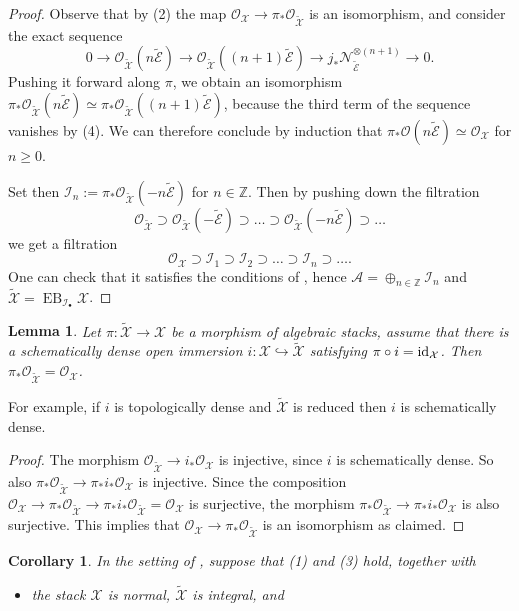 \documentclass{amsart}
\newcommand{\bZ}{\mathbb{Z}}
\newcommand{\cA}{\mathcal{A}}
\newcommand{\cE}{\mathcal{E}}
\newcommand{\cI}{\mathcal{I}}
\newcommand{\cN}{\mathcal{N}}
\newcommand{\cO}{\mathcal{O}}
\newcommand{\cX}{\mathcal{X}}
\newcommand{\id}{\rm{id}}
\DeclareMathOperator{\EB}{EB}
\newtheorem{Lemma}[theorem]{Lemma}
\newtheorem{Cor}[theorem]{Corollary}
\theoremstyle{definition}
\theoremstyle{definition}
\begin{document}
{\begin{proof}
    Observe that by (2) the map $\cO_\cX \to \pi_*\cO_{\widetilde{\cX}}$ is an isomorphism, and consider the exact sequence
    \[ 0 \to \cO_{\widetilde{\cX}}(n\widetilde{\cE}) \to \cO_{\widetilde{\cX}}((n+1)\widetilde{\cE}) \to j_* \cN_{\widetilde{\cE}}^{\otimes (n+1)} \to 0. \]
    Pushing it forward along $\pi$, we obtain an isomorphism $\pi_*\cO_{\widetilde{\cX}}(n\widetilde{\cE})\simeq \pi_*\cO_{\widetilde{\cX}}((n+1)\widetilde{\cE})$, because the third term of the sequence vanishes by (4). We can therefore conclude by induction that $\pi_*\cO(n\widetilde{\cE})\simeq\cO_{\cX}$ for $n\geq 0$.

    Set then $\cI_n:=\pi_*\cO_{\widetilde{\cX}}(-n\widetilde{\cE})$ for $n\in\bZ$. Then by pushing down the filtration
    \[ \cO_{\widetilde{\cX}}\supset \cO_{\widetilde{\cX}}(-\widetilde{\cE}) \supset \ldots \supset \cO_{\widetilde{\cX}}(-n\widetilde{\cE}) \supset \ldots \]
    we get a filtration 
    \[ \cO_{\cX}\supset \cI_1 \supset \cI_2 \supset \ldots \supset \cI_n \supset \ldots. \]
    One can check that it satisfies the conditions of ,
    hence $\cA=\oplus_{n\in\bZ} \cI_n$ and $\widetilde{\cX}=\EB_{\cI_\bullet}\cX$.
\end{proof}
\begin{Lemma}\label{lm:iso of O}
    Let $\pi:\widetilde{\cX}\to \cX$ be a morphism of algebraic stacks,
    assume that there is a schematically dense open immersion $i:\cX\hookrightarrow \widetilde{\cX}$ satisfying $\pi\circ i = \id_{\cX}$. Then $\pi_*\cO_{\widetilde{\cX}}=\cO_\cX$.
\end{Lemma} 
For example, if $i$ is topologically dense and $\widetilde{\cX}$ is reduced then $i$ is schematically dense.
\begin{proof}
    The morphism $\cO_{\widetilde{\cX}}\to i_*\cO_{\cX}$ is injective, since $i$ is schematically dense. So also $\pi_*\cO_{\widetilde{\cX}}\to \pi_*i_*\cO_{\cX}$ is injective. Since the composition $\cO_{\cX} \longrightarrow \pi_*\cO_{\widetilde{\cX}} \longrightarrow \pi_*i_*\cO_{\widetilde{\cX}}=\cO_{\cX}$
    is surjective, the morphism $\pi_*\cO_{\widetilde{\cX}}\to \pi_*i_*\cO_{\cX}$ is also surjective. This implies that $\cO_\cX \to \pi_*\cO_{\widetilde{\cX}}$ is an isomorphism as claimed.
\end{proof}
\begin{Cor}\label{cor:criterion 2}
    In the setting of , suppose that (1) and (3) hold, together with 
    \begin{itemize}
        \item[(5)] the stack $\cX$ is normal, $\widetilde{\cX}$ is integral, and 

\end{itemize}
\end{Cor}}
\end{document}
